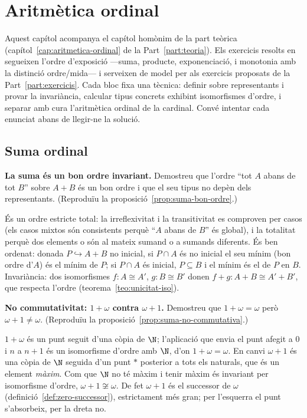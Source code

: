\chapter{Aritmètica ordinal}\label{cap:practica-aritmetica-ordinal}

Aquest capítol acompanya el capítol homònim de la part teòrica (capítol~\ref{cap:aritmetica-ordinal} de la Part~\ref{part:teoria}). Els exercicis resolts en segueixen l'ordre d'exposició ---suma, producte, exponenciació, i monotonia amb la distinció ordre/mida--- i serveixen de model per als exercicis proposats de la Part~\ref{part:exercicis}. Cada bloc fixa una tècnica: definir sobre representants i provar la invariància, calcular tipus concrets exhibint isomorfismes d'ordre, i separar amb cura l'aritmètica ordinal de la cardinal. Convé intentar cada enunciat abans de llegir-ne la solució.

\section{Suma ordinal}\label{prac:suma-ordinal}

\begin{exercici}
\textbf{La suma és un bon ordre invariant.} Demostreu que l'ordre \enquote{tot \(A\) abans de tot \(B\)} sobre \(A+B\) és un bon ordre i que el seu tipus no depèn dels representants. (Reproduïu la proposició~\ref{prop:suma-bon-ordre}.)
\end{exercici}
\begin{solucio}
És un ordre estricte total: la irreflexivitat i la transitivitat es comproven per casos (els casos mixtos són consistents perquè \enquote{\(A\) abans de \(B\)} és global), i la totalitat perquè dos elements o són al mateix sumand o a sumands diferents. És ben ordenat: donada \(P\hookrightarrow A+B\) no inicial, si \(P\cap A\) és no inicial el seu mínim (bon ordre d'\(A\)) és el mínim de \(P\); si \(P\cap A\) és inicial, \(P\subseteq B\) i el mínim és el de \(P\) en \(B\). Invariància: dos isomorfismes \(f\colon A\cong A'\), \(g\colon B\cong B'\) donen \(f+g\colon A+B\cong A'+B'\), que respecta l'ordre (teorema~\ref{teo:unicitat-iso}).
\end{solucio}

\begin{exercici}
\textbf{No commutativitat: \(1+\omega\) contra \(\omega+1\).} Demostreu que \(1+\omega=\omega\) però \(\omega+1\neq\omega\). (Reproduïu la proposició~\ref{prop:suma-no-commutativa}.)
\end{exercici}
\begin{solucio}
\(1+\omega\) és un punt seguit d'una còpia de \(\N\); l'aplicació que envia el punt afegit a \(0\) i \(n\) a \(n+1\) és un isomorfisme d'ordre amb \(\N\), d'on \(1+\omega=\omega\). En canvi \(\omega+1\) és una còpia de \(\N\) seguida d'un punt \(\ast\) posterior a tots els naturals, que és un element \emph{màxim}. Com que \(\N\) no té màxim i tenir màxim és invariant per isomorfisme d'ordre, \(\omega+1\not\cong\omega\). De fet \(\omega+1\) és el successor de \(\omega\) (definició~\ref{def:zero-successor}), estrictament més gran; per l'esquerra el punt s'absorbeix, per la dreta no.
\end{solucio}

